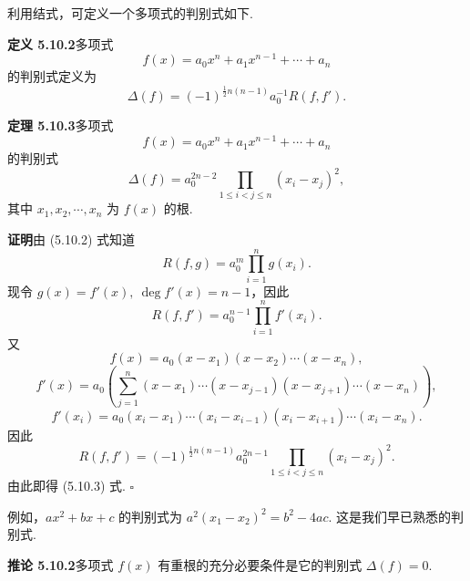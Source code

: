 \documentclass[UTF8,12pt,a4paper,fontset=fandol]{ctexart}
\begin{document}
利用结式，可定义一个多项式的判别式如下.

\noindent\textbf{定义 5.10.2}\quad 多项式
\[
f(x)=a_0x^n+a_1x^{n-1}+\cdots+a_n
\]
的判别式定义为
\[
\Delta(f)=(-1)^{\frac12n(n-1)}a_0^{-1}R(f,f').
\]

\noindent\textbf{定理 5.10.3}\quad 多项式
\[
f(x)=a_0x^n+a_1x^{n-1}+\cdots+a_n
\]
的判别式
\begin{equation}
\Delta(f)=a_0^{2n-2}\prod_{1\leq i<j\leq n}(x_i-x_j)^2,
\tag{5.10.3}
\end{equation}
其中 $x_1,x_2,\cdots,x_n$ 为 $f(x)$ 的根.

\noindent\textbf{证明}\quad 由 (5.10.2) 式知道
\[
R(f,g)=a_0^m\prod_{i=1}^n g(x_i).
\]
现令 $g(x)=f'(x),\ \deg f'(x)=n-1$，因此
\[
R(f,f')=a_0^{n-1}\prod_{i=1}^n f'(x_i).
\]
又
\[
f(x)=a_0(x-x_1)(x-x_2)\cdots(x-x_n),
\]
\[
f'(x)=a_0\left(\sum_{j=1}^n(x-x_1)\cdots(x-x_{j-1})(x-x_{j+1})\cdots(x-x_n)\right),
\]
\[
f'(x_i)=a_0(x_i-x_1)\cdots(x_i-x_{i-1})(x_i-x_{i+1})\cdots(x_i-x_n).
\]
因此
\[
R(f,f')=(-1)^{\frac12n(n-1)}a_0^{2n-1}\prod_{1\leq i<j\leq n}(x_i-x_j)^2.
\]
由此即得 (5.10.3) 式. $\square$

例如，$ax^2+bx+c$ 的判别式为 $a^2(x_1-x_2)^2=b^2-4ac$. 这是我们早已熟悉的判别式.

\noindent\textbf{推论 5.10.2}\quad 多项式 $f(x)$ 有重根的充分必要条件是它的判别式 $\Delta(f)=0$.
\end{document}
